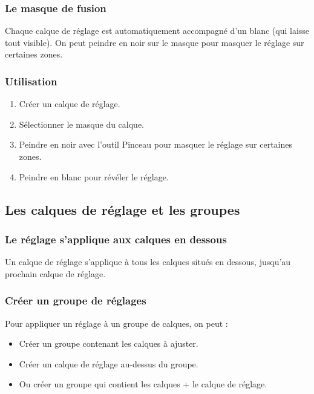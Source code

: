 \subsubsection{Le masque de fusion}

Chaque calque de réglage est automatiquement accompagné d'un  blanc (qui laisse tout visible). On peut peindre en noir sur le masque pour masquer le réglage sur certaines zones.

\subsubsection{Utilisation}

\begin{enumerate}
    \item Créer un calque de réglage.
    \item Sélectionner le masque du calque.
    \item Peindre en noir avec l'outil Pinceau pour masquer le réglage sur certaines zones.
    \item Peindre en blanc pour révéler le réglage.
\end{enumerate}

\subsection{Les calques de réglage et les groupes}

\subsubsection{Le réglage s'applique aux calques en dessous}

Un calque de réglage s'applique à tous les calques situés en dessous, jusqu'au prochain calque de réglage.

\subsubsection{Créer un groupe de réglages}

Pour appliquer un réglage à un groupe de calques, on peut :

\begin{itemize}
    \item Créer un groupe contenant les calques à ajuster.
    \item Créer un calque de réglage au-dessus du groupe.
    \item Ou créer un groupe qui contient les calques + le calque de réglage.
\end{itemize}

